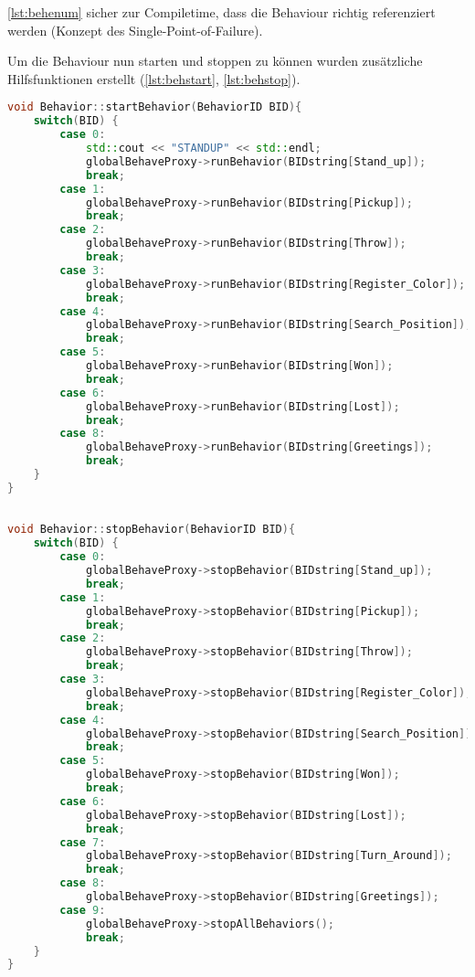         \autoref{lst:behenum} sicher zur Compiletime, dass die Behaviour richtig
        referenziert werden (Konzept des Single-Point-of-Failure).

        Um die Behaviour nun starten und stoppen zu können wurden zusätzliche
        Hilfsfunktionen erstellt
        (\autoref{lst:behstart}, \autoref{lst:behstop}).

\begin{lstlisting}[language=c++,
                   caption={Behaviour Enumerator},
                   label={lst:behstart}]
void Behavior::startBehavior(BehaviorID BID){
    switch(BID) {
        case 0:
            std::cout << "STANDUP" << std::endl;
            globalBehaveProxy->runBehavior(BIDstring[Stand_up]);
            break;
        case 1:
            globalBehaveProxy->runBehavior(BIDstring[Pickup]);
            break;
        case 2:
            globalBehaveProxy->runBehavior(BIDstring[Throw]);
            break;
        case 3:
            globalBehaveProxy->runBehavior(BIDstring[Register_Color]);
            break;
        case 4:
            globalBehaveProxy->runBehavior(BIDstring[Search_Position]);
            break;
        case 5:
            globalBehaveProxy->runBehavior(BIDstring[Won]);
            break;
        case 6:
            globalBehaveProxy->runBehavior(BIDstring[Lost]);
            break;
        case 8:
            globalBehaveProxy->runBehavior(BIDstring[Greetings]);
            break;
    }
}
\end{lstlisting}

\begin{lstlisting}[language=c++,
                   caption={Behaviour Enumerator},
                   label={lst:behstop}]

void Behavior::stopBehavior(BehaviorID BID){
    switch(BID) {
        case 0:
            globalBehaveProxy->stopBehavior(BIDstring[Stand_up]);
            break;
        case 1:
            globalBehaveProxy->stopBehavior(BIDstring[Pickup]);
            break;
        case 2:
            globalBehaveProxy->stopBehavior(BIDstring[Throw]);
            break;
        case 3:
            globalBehaveProxy->stopBehavior(BIDstring[Register_Color]);
            break;
        case 4:
            globalBehaveProxy->stopBehavior(BIDstring[Search_Position]);
            break;
        case 5:
            globalBehaveProxy->stopBehavior(BIDstring[Won]);
            break;
        case 6:
            globalBehaveProxy->stopBehavior(BIDstring[Lost]);
            break;
        case 7:
            globalBehaveProxy->stopBehavior(BIDstring[Turn_Around]);
            break;
        case 8:
            globalBehaveProxy->stopBehavior(BIDstring[Greetings]);
        case 9:
            globalBehaveProxy->stopAllBehaviors();
            break;
    }
}
\end{lstlisting}

